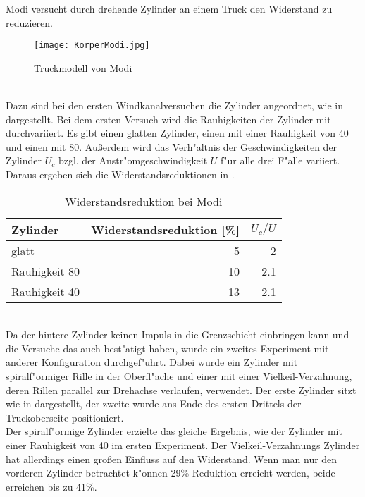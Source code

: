 Modi \cite{MODI.1991} versucht durch drehende Zylinder an einem Truck den Widerstand zu reduzieren.
\begin{figure}[h]
	\centering
	\texttt{[image: KorperModi.jpg]}
	\caption{Truckmodell von Modi \cite{MODI.1991}}
	\label{fig:Modi}
\end{figure}\\
Dazu sind bei den ersten Windkanalversuchen die Zylinder angeordnet, wie in  dargestellt. Bei dem ersten Versuch wird die Rauhigkeiten der Zylinder mit durchvariiert. Es gibt einen glatten Zylinder, einen mit einer Rauhigkeit von 40 und einen mit 80. Au\ss{}erdem wird das Verh"altnis der Geschwindigkeiten der Zylinder \(U_c\) bzgl. der Anstr"omgeschwindigkeit \(U\) f"ur alle drei F"alle variiert. Daraus ergeben sich die Widerstandsreduktionen in .
\begin{table}[h!]
	\centering
	\begin{tabular}{lrr}
		\toprule
		Zylinder & Widerstandsreduktion [\%] & \(U_c/U\)\\
		\midrule
		glatt & 5 & 2\\
		Rauhigkeit 80 & 10 & 2.1\\
		Rauhigkeit 40 & 13 & 2.1\\
		\bottomrule
	\end{tabular}
	\caption{Widerstandsreduktion bei Modi}
	\label{tab:Modi}
\end{table}\\
Da der hintere Zylinder keinen Impuls in die Grenzschicht einbringen kann und die Versuche das auch best"atigt haben, wurde ein zweites Experiment mit anderer Konfiguration durchgef"uhrt. Dabei wurde ein Zylinder mit spiralf"ormiger Rille in der Oberfl"ache und einer mit einer Vielkeil-Verzahnung, deren Rillen parallel zur Drehachse verlaufen, verwendet. Der erste Zylinder sitzt wie in  dargestellt, der zweite wurde ans Ende des ersten Drittels der Truckoberseite positioniert.\\
Der spiralf"ormige Zylinder erzielte das gleiche Ergebnis, wie der Zylinder mit einer Rauhigkeit von 40 im ersten Experiment. Der Vielkeil-Verzahnungs Zylinder hat allerdings einen gro\ss{}en Einfluss auf den Widerstand. Wenn man nur den vorderen Zylinder betrachtet k"onnen 29\% Reduktion erreicht werden, beide erreichen bis zu 41\%.

